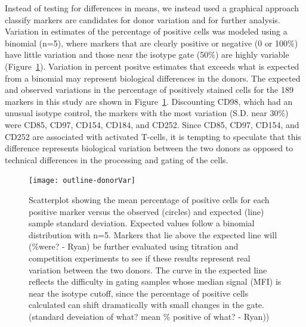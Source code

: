 \documentclass[12pt]{article}
\newcommand{\Rpackage}[1]{{\textit{#1}}}
\begin{document}
Instead of testing for differences in means, we instead used a graphical
approach classify markers are candidates for donor variation and for further
analysis. Variation in estimates of the percentage of positive cells was
modeled using a binomial (n=5), where markers that are clearly positive or
negative (0 or 100\%) have little variation and those near the isotype gate
(50\%) are highly variable (Figure~\ref{fig:donorVar}). Variation in percent
positve estimates that exceeds what is expected from a binomial may represent
biological differences in the donors. The expected and observed variations in
the percentage of positively stained cells for the 189 markers in this study
are shown in Figure~\ref{fig:donorVar}. Discounting CD98, which had an unusual
isotype control, the markers with the most variation (S.D. near 30\%) were
CD85, CD97, CD154, CD184, and CD252. Since CD85, CD97, CD154, and CD252 are
associated with activated T-cells, it is tempting to speculate that this
difference represents biological variation between the two donors as opposed to
technical differences in the processing and gating of the cells.

\begin{figure}
\centering
\texttt{[image: outline-donorVar]}
\caption{Scatterplot showing the mean percentage of positive cells for each
positive marker versus the observed (circles) and expected (line) sample
standard deviation. Expected values follow a binomial distribution with n=5.
Markers that lie above the expected line will (\%were? - Ryan) be further
evaluated using titration and competition experiments to see if these results
represent real variation between the two donors. The curve in the expected line
reflects the difficulty in gating samples whose median signal (MFI) is near the
isotype cutoff, since the percentage of positive cells calculated can shift
dramatically with small changes in the gate. (standard deveiation of what? mean
\% positive of what? - Ryan)) }
\label{fig:donorVar}
\end{figure}

%
%
%
%
%
%
\end{document}
